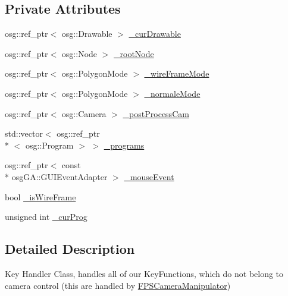 \subsection*{Private Attributes}
\begin{DoxyCompactItemize}
\item 
osg\+::ref\+\_\+ptr$<$ osg\+::\+Drawable $>$ \hyperlink{classbrtr_1_1_key_handler_a4b0e380186a8172af6cf7c10dcff675a}{\+\_\+cur\+Drawable}
\item 
osg\+::ref\+\_\+ptr$<$ osg\+::\+Node $>$ \hyperlink{classbrtr_1_1_key_handler_a2ff68d9c79145d235f50fec1da625f99}{\+\_\+root\+Node}
\item 
osg\+::ref\+\_\+ptr$<$ osg\+::\+Polygon\+Mode $>$ \hyperlink{classbrtr_1_1_key_handler_a7aff4e23d4c614d8e0ccdc29a3c8882f}{\+\_\+wire\+Frame\+Mode}
\item 
osg\+::ref\+\_\+ptr$<$ osg\+::\+Polygon\+Mode $>$ \hyperlink{classbrtr_1_1_key_handler_ae210945e48748029cbea37fde7d601b5}{\+\_\+normale\+Mode}
\item 
osg\+::ref\+\_\+ptr$<$ osg\+::\+Camera $>$ \hyperlink{classbrtr_1_1_key_handler_aa4cc5f6ac9134e473f37968dfb1dd821}{\+\_\+post\+Process\+Cam}
\item 
std\+::vector$<$ osg\+::ref\+\_\+ptr\\*
$<$ osg\+::\+Program $>$ $>$ \hyperlink{classbrtr_1_1_key_handler_a492d086b9458475e595b3627a8dee0f9}{\+\_\+programs}
\item 
osg\+::ref\+\_\+ptr$<$ const \\*
osg\+G\+A\+::\+G\+U\+I\+Event\+Adapter $>$ \hyperlink{classbrtr_1_1_key_handler_a1b2404dcd19426a93d4474cd45da84e8}{\+\_\+mouse\+Event}
\item 
bool \hyperlink{classbrtr_1_1_key_handler_a6939e2c5e93e53d6090c999eae2fb927}{\+\_\+is\+Wire\+Frame}
\item 
unsigned int \hyperlink{classbrtr_1_1_key_handler_a578b374029e318a509983a01253a7736}{\+\_\+cur\+Prog}
\end{DoxyCompactItemize}


\subsection{Detailed Description}
Key Handler Class, handles all of our Key\+Functions, which do not belong to camera control (this are handled by \hyperlink{classbrtr_1_1_f_p_s_camera_manipulator}{F\+P\+S\+Camera\+Manipulator}) 

